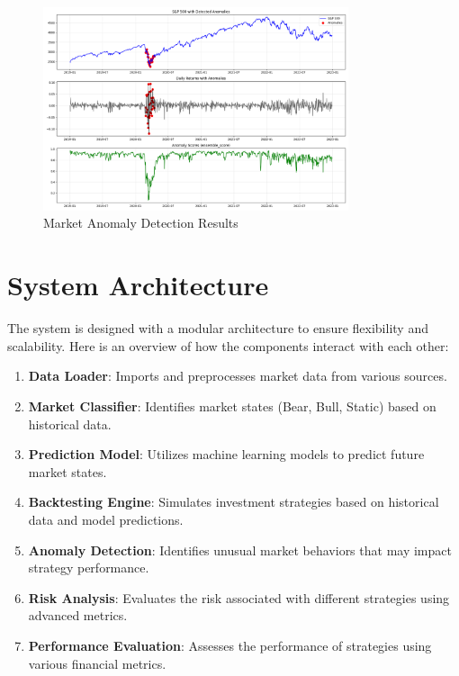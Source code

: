 \documentclass[13pt]{article}
\begin{document}
\begin{figure}[htbp]
	\centering
	\includegraphics[width=0.8\textwidth]{../results/anomalies/anomalies_visualization.png}
	\caption{Market Anomaly Detection Results}
	\label{fig:anomalies}
\end{figure}

\section{System Architecture}

The system is designed with a modular architecture to ensure flexibility and scalability. Here is an overview of how the components interact with each other:

\begin{enumerate}
	\item \textbf{Data Loader}: Imports and preprocesses market data from various sources.
	\item \textbf{Market Classifier}: Identifies market states (Bear, Bull, Static) based on historical data.
	\item \textbf{Prediction Model}: Utilizes machine learning models to predict future market states.
	\item \textbf{Backtesting Engine}: Simulates investment strategies based on historical data and model predictions.
	\item \textbf{Anomaly Detection}: Identifies unusual market behaviors that may impact strategy performance.
	\item \textbf{Risk Analysis}: Evaluates the risk associated with different strategies using advanced metrics.
	\item \textbf{Performance Evaluation}: Assesses the performance of strategies using various financial metrics.
\end{enumerate}
\end{document}
